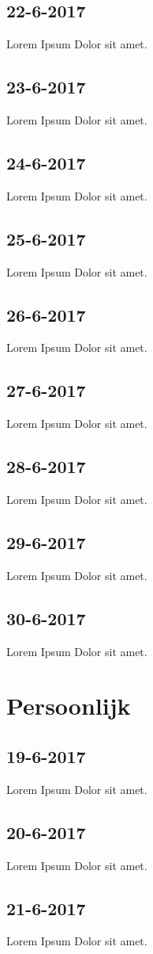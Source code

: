 \documentclass{uva-inf-article}
\begin{document}
\subsection{22-6-2017}
Lorem Ipsum Dolor sit amet.
\subsection{23-6-2017}
Lorem Ipsum Dolor sit amet.
\subsection{24-6-2017}
Lorem Ipsum Dolor sit amet.
\subsection{25-6-2017}
Lorem Ipsum Dolor sit amet.
\subsection{26-6-2017}
Lorem Ipsum Dolor sit amet.
\subsection{27-6-2017}
Lorem Ipsum Dolor sit amet.
\subsection{28-6-2017}
Lorem Ipsum Dolor sit amet.
\subsection{29-6-2017}
Lorem Ipsum Dolor sit amet.
\subsection{30-6-2017}
Lorem Ipsum Dolor sit amet.

\section{Persoonlijk}
\subsection{19-6-2017}
Lorem Ipsum Dolor sit amet.
\subsection{20-6-2017}
Lorem Ipsum Dolor sit amet.
\subsection{21-6-2017}
Lorem Ipsum Dolor sit amet.
\end{document}
